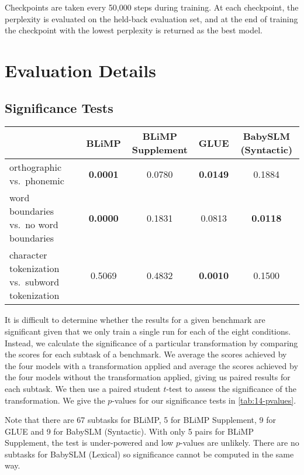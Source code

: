 Checkpoints are taken every 50,000 steps during training. At each checkpoint, the perplexity is evaluated on the held-back evaluation set, and at the end of training the checkpoint with the lowest perplexity is returned as the best model. 

\section{Evaluation Details}

\subsection{Significance Tests}
\label{sec:14-significance}

\begin{table*}[t]
    \centering
    \small
    \begin{tabular}{l|cccc}
     & BLiMP&BLiMP Supplement & GLUE & BabySLM (Syntactic) \\
\hline
orthographic vs.\ phonemic & \textbf{0.0001} & 0.0780 & \textbf{0.0149} & 0.1884 \\
word boundaries vs.\ no word boundaries & \textbf{0.0000} & 0.1831 & 0.0813 & \textbf{0.0118} \\
character tokenization vs.\ subword tokenization & 0.5069 & 0.4832 & \textbf{0.0010} & 0.1500 \\
    \end{tabular}
    \caption{$p$-values from the paired student t-tests for each experiment. Significant results are given in \textbf{bold} using an alpha level of 0.05.}
    \label{tab:14-pvalues}
\end{table*}


It is difficult to determine whether the results for a given benchmark are significant given that we only train a single run for each of the eight conditions. Instead, we calculate the significance of a particular transformation by comparing the scores for each subtask of a benchmark. We average the scores achieved by the four models with a transformation applied and average the scores achieved by the four models without the transformation applied, giving us paired results for each subtask. We then use a paired student $t$-test to assess the significance of the transformation. We give the $p$-values for our significance tests in \cref{tab:14-pvalues}.

Note that there are 67 subtasks for BLiMP, 5 for BLiMP Supplement, 9 for GLUE and 9 for BabySLM (Syntactic). With only 5 pairs for BLiMP Supplement, 
the test is under-powered and low $p$-values are unlikely. There are no subtasks for BabySLM (Lexical) so significance cannot be computed in the same way. 


